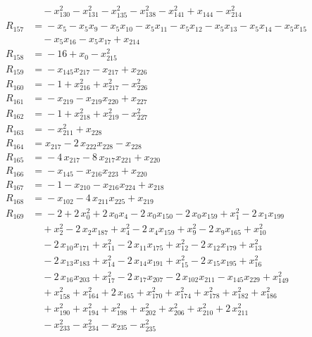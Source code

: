 \begin{align*}
&\quad{} -x_{130}^{2} -x_{131}^{2} -x_{135}^{2} -x_{138}^{2} -x_{141}^{2} +x_{144} -x_{214}^{2} \\[2pt]
R_{157} &={} -x_{5} -x_{5} x_{9} -x_{5} x_{10} -x_{5} x_{11} -x_{5} x_{12} -x_{5} x_{13} -x_{5} x_{14} -x_{5} x_{15} \\
&\quad{} -x_{5} x_{16} -x_{5} x_{17} +x_{214} \\[2pt]
R_{158} &={} -16 +x_{0} -x_{215}^{2} \\[2pt]
R_{159} &={} -x_{145} x_{217} -x_{217} +x_{226} \\[2pt]
R_{160} &={} -1 +x_{216}^{2} +x_{217}^{2} -x_{226}^{2} \\[2pt]
R_{161} &={} -x_{219} -x_{219} x_{220} +x_{227} \\[2pt]
R_{162} &={} -1 +x_{218}^{2} +x_{219}^{2} -x_{227}^{2} \\[2pt]
R_{163} &={} -x_{211}^{2} +x_{228} \\[2pt]
R_{164} &={} x_{217} -2\,x_{222} x_{228} -x_{228} \\[2pt]
R_{165} &={} -4\,x_{217} -8\,x_{217} x_{221} +x_{220} \\[2pt]
R_{166} &={} -x_{145} -x_{216} x_{223} +x_{220} \\[2pt]
R_{167} &={} -1 -x_{210} -x_{216} x_{224} +x_{218} \\[2pt]
R_{168} &={} -x_{102} -4\,x_{211} x_{225} +x_{219} \\[2pt]
R_{169} &={} -2 +2\,x_{0}^{2} +2\,x_{0} x_{4} -2\,x_{0} x_{150} -2\,x_{0} x_{159} +x_{1}^{2} -2\,x_{1} x_{199} \\
&\quad{} +x_{2}^{2} -2\,x_{2} x_{187} +x_{4}^{2} -2\,x_{4} x_{159} +x_{9}^{2} -2\,x_{9} x_{165} +x_{10}^{2} \\
&\quad{} -2\,x_{10} x_{171} +x_{11}^{2} -2\,x_{11} x_{175} +x_{12}^{2} -2\,x_{12} x_{179} +x_{13}^{2} \\
&\quad{} -2\,x_{13} x_{183} +x_{14}^{2} -2\,x_{14} x_{191} +x_{15}^{2} -2\,x_{15} x_{195} +x_{16}^{2} \\
&\quad{} -2\,x_{16} x_{203} +x_{17}^{2} -2\,x_{17} x_{207} -2\,x_{102} x_{211} -x_{145} x_{229} +x_{149}^{2} \\
&\quad{} +x_{158}^{2} +x_{164}^{2} +2\,x_{165} +x_{170}^{2} +x_{174}^{2} +x_{178}^{2} +x_{182}^{2} +x_{186}^{2} \\
&\quad{} +x_{190}^{2} +x_{194}^{2} +x_{198}^{2} +x_{202}^{2} +x_{206}^{2} +x_{210}^{2} +2\,x_{211}^{2} \\
&\quad{} -x_{233}^{2} -x_{234}^{2} -x_{235} -x_{235}^{2} \\[2pt]

\end{align*}
